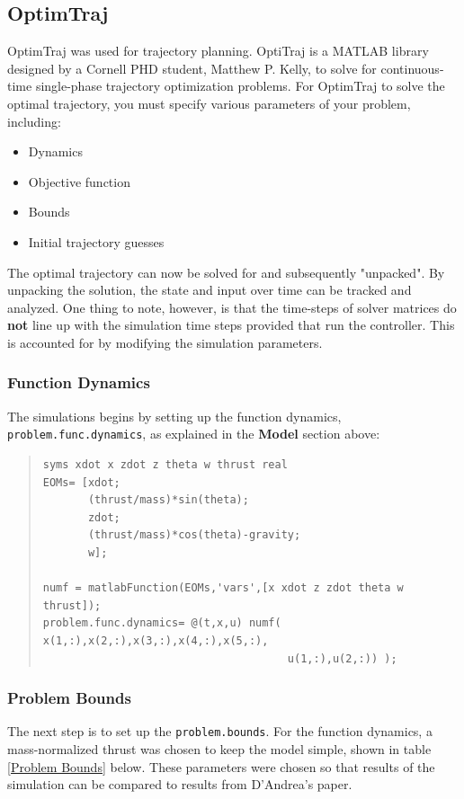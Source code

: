 \documentclass[12pt]{article}
\begin{document}
\subsection{OptimTraj}

OptimTraj \cite{OptimTraj} was used for trajectory planning. OptiTraj is a MATLAB library designed by a Cornell PHD student, Matthew P. Kelly, to solve for continuous-time single-phase trajectory optimization problems. For OptimTraj to solve the optimal trajectory, you must specify various parameters of your problem, including:
\begin{itemize}
  \item Dynamics
  \item Objective function
  \item Bounds
  \item Initial trajectory guesses
\end{itemize}

The optimal trajectory can now be solved for and subsequently "unpacked". By unpacking the solution, the state and input over time can be tracked and analyzed. One thing to note, however, is that the time-steps of solver matrices do \textbf{not} line up with the simulation time steps provided that run the controller. This is accounted for by modifying the simulation parameters. 
\subsubsection{Function Dynamics}
The simulations begins by setting up the function dynamics, \lstinline!problem.func.dynamics!, as explained in the \textbf{Model} section above: 
\begin{quote}
\begin{lstlisting}
syms xdot x zdot z theta w thrust real
EOMs= [xdot;
       (thrust/mass)*sin(theta);
       zdot;
       (thrust/mass)*cos(theta)-gravity;
       w];

numf = matlabFunction(EOMs,'vars',[x xdot z zdot theta w thrust]);
problem.func.dynamics= @(t,x,u) numf( x(1,:),x(2,:),x(3,:),x(4,:),x(5,:),
                                      u(1,:),u(2,:)) );

\end{lstlisting}
\end{quote}

\subsubsection{Problem Bounds}
The next step is to set up the \lstinline!problem.bounds!. For the function dynamics, a mass-normalized thrust was chosen to keep the model simple, shown in table \ref{Problem Bounds} below. These parameters were chosen so that results of the simulation can be compared to results from D'Andrea's paper\cite{D'Andrea}. 
\end{document}
